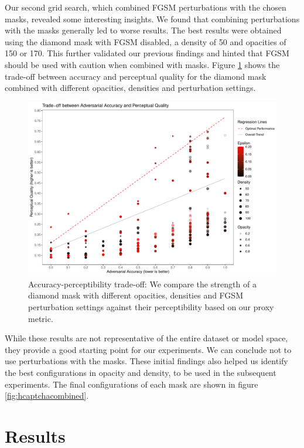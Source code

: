 \documentclass[a4paper, oneside]{discothesis}
\begin{document}
Our second grid search, which combined FGSM perturbations with the chosen masks, revealed some interesting insights. We found that combining perturbations with the masks generally led to worse results. The best results were obtained using the diamond mask with FGSM disabled, a density of 50 and opacities of 150 or 170. This further validated our previous findings and hinted that FGSM should be used with caution when combined with masks. Figure \ref{fig:tradeoff-2} shows the trade-off between accuracy and perceptual quality for the diamond mask combined with different opacities, densities and perturbation settings.

\begin{figure}
	\centering
	\includegraphics[width=1\columnwidth]{figures/eval_cls_perturb.pdf}
	\caption{Accuracy-perceptibility trade-off: We compare the strength of a diamond mask with different opacities, densities and FGSM perturbation settings against their perceptibility based on our proxy metric.}
	\label{fig:tradeoff-2}
\end{figure}

While these results are not representative of the entire dataset or model space, they provide a good starting point for our experiments. We can conclude not to use perturbations with the masks. These initial findings also helped us identify the best configurations in opacity and density, to be used in the subsequent experiments. The final configurations of each mask are shown in figure \ref{fig:hcaptchacombined}.

\section{Results}
\end{document}
